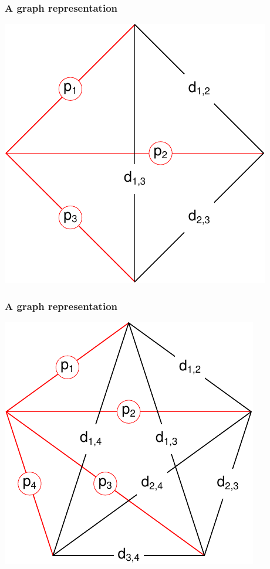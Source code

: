 \documentclass[20pt]{beamer}
\begin{document}
\begin{frame}
\frametitle{A graph representation}
\centering
\includegraphics[scale=1.5]{Figures/edgep3.pdf}\\
\end{frame}

\begin{frame}
\frametitle{A graph representation}
\centering
\includegraphics[scale=1.5]{Figures/edgep4.pdf}\\
\end{frame}
\end{document}
